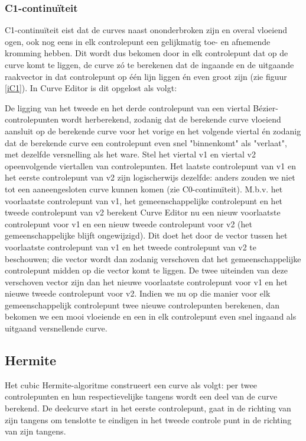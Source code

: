\documentclass[a4paper,11pt,oneside, titlepage]{article}
\begin{document}
\subsubsection{C1-continu\"iteit \label{sC1}}
C1-continu\"iteit eist dat de curves naast ononderbroken zijn en overal vloeiend ogen, ook nog eens in elk controlepunt een gelijkmatig toe- en afnemende kromming hebben. Dit wordt dus bekomen door in elk controlepunt dat op de curve komt te liggen, de curve z\'o te berekenen dat de ingaande en de uitgaande raakvector
in dat controlepunt op \'e\'en lijn liggen \'en even groot zijn (zie figuur \ref{iC1}). In Curve Editor is dit opgelost als volgt:

De ligging van het tweede en het derde controlepunt van een viertal B\'ezier-controlepunten wordt herberekend, zodanig dat de berekende curve vloeiend aansluit op de berekende curve voor het vorige en het volgende viertal \'en zodanig dat de berekende curve een controlepunt even snel "binnenkomt" als "verlaat", met dezelfde versnelling als het ware. Stel het viertal v1 en viertal v2 opeenvolgende viertallen van controlepunten. Het laatste controlepunt van v1 en het eerste controlepunt van v2 zijn logischerwijs dezelfde: anders zouden we niet tot een aaneengesloten curve kunnen komen (zie C0-continu\"iteit). M.b.v. het voorlaatste controlepunt van v1, het gemeenschappelijke controlepunt en het tweede controlepunt van v2 berekent Curve Editor nu een nieuw voorlaatste controlepunt voor v1 en een nieuw tweede controlepunt voor v2 (het gemeenschappelijke blijft ongewijzigd). Dit doet het door de vector tussen het voorlaatste controlepunt van v1 en het tweede controlepunt van v2 te beschouwen; die vector wordt dan zodanig verschoven dat het gemeenschappelijke controlepunt midden op die vector komt te liggen. De twee uiteinden van deze verschoven vector zijn dan het nieuwe voorlaatste controlepunt voor v1 en het nieuwe tweede controlepunt voor v2. Indien we nu op die manier voor elk gemeenschappelijk controlepunt twee nieuwe controlepunten berekenen, dan bekomen we een mooi vloeiende en een in elk controlepunt even snel ingaand als uitgaand versnellende curve.
\subsection{Hermite}
Het cubic Hermite-algoritme construeert een curve als volgt: 
per twee controlepunten en hun respectievelijke tangens wordt een deel van de curve berekend.
De deelcurve start in het eerste controlepunt, gaat in de richting van zijn tangens om
tenslotte te eindigen in het tweede controle punt in de richting van zijn tangens.
\end{document}
